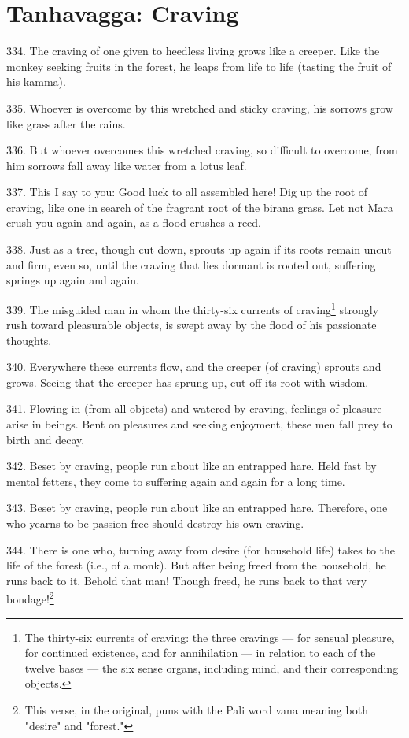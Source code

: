 \newpage
\chapter{Tanhavagga: Craving}
334. The craving of one given to heedless living grows like a creeper. Like the monkey seeking fruits in the forest, he leaps from life to life (tasting the fruit of his kamma).

335. Whoever is overcome by this wretched and sticky craving, his sorrows grow like grass after the rains.

336. But whoever overcomes this wretched craving, so difficult to overcome, from him sorrows fall away like water from a lotus leaf.

337. This I say to you: Good luck to all assembled here! Dig up the root of craving, like one in search of the fragrant root of the birana grass. Let not Mara crush you again and again, as a flood crushes a reed.

338. Just as a tree, though cut down, sprouts up again if its roots remain uncut and firm, even so, until the craving that lies dormant is rooted out, suffering springs up again and again.

339. The misguided man in whom the thirty-six currents of craving\footnote{The thirty-six currents of craving: the three cravings — for sensual pleasure, for continued existence, and for annihilation — in relation to each of the twelve bases — the six sense organs, including mind, and their corresponding objects.} strongly rush toward pleasurable objects, is swept away by the flood of his passionate thoughts.

340. Everywhere these currents flow, and the creeper (of craving) sprouts and grows. Seeing that the creeper has sprung up, cut off its root with wisdom.

341. Flowing in (from all objects) and watered by craving, feelings of pleasure arise in beings. Bent on pleasures and seeking enjoyment, these men fall prey to birth and decay.

342. Beset by craving, people run about like an entrapped hare. Held fast by mental fetters, they come to suffering again and again for a long time.

343. Beset by craving, people run about like an entrapped hare. Therefore, one who yearns to be passion-free should destroy his own craving.

344. There is one who, turning away from desire (for household life) takes to the life of the forest (i.e., of a monk). But after being freed from the household, he runs back to it. Behold that man! Though freed, he runs back to that very bondage!\footnote{This verse, in the original, puns with the Pali word vana meaning both "desire" and "forest."}

